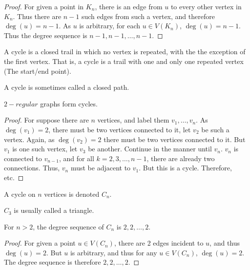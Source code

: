         \begin{proof}
        For given a point in $K_n$, there is an edge from $u$ to every other vertex in $K_n$. Thus there are $n-1$ such edges from such 
        a vertex, and therefore $\deg(u) = n-1$. As $u$ is arbitrary, for each $u\in V(K_n)$, $\deg(u) = n-1$. Thus the degree sequence is $n-1,n-1,\hdots, n-1$.
        \end{proof}
        \begin{definition}
        A cycle is a closed trail in which no vertex is repeated, with the the exception of the first vertex. That is, a cycle is a trail with one and only one repeated vertex (The start/end point).
        \end{definition}
        \begin{remark}
        A cycle is sometimes called a closed path.
        \end{remark}
        \begin{corollary}
        $2-regular$ graphs form cycles.
        \end{corollary}
        \begin{proof}
        For suppose there are $n$ vertices, and label them $v_1,\hdots, v_n$. As $\deg(v_1)=2$, there must be two vertices connected to it, let $v_2$ be such a vertex. Again, as $\deg(v_2)=2$ there must be two vertices connected to it. But $v_1$ is one such vertex, let $v_3$ be another. Continue in the manner until $v_n$. $v_n$ is connected to $v_{n-1}$, and for all $k=2,3,\hdots, n-1$, there are already two connections. Thus, $v_n$ must be adjacent to $v_1$. But this is a cycle. Therefore, etc.
        \end{proof}
        \begin{definition}
        A cycle on $n$ vertices is denoted $C_n$.
        \end{definition}
        \begin{remark}
        $C_3$ is usually called a triangle.
        \end{remark}
        \begin{corollary}
        For $n>2$, the degree sequence of $C_n$ is $2,2,\hdots, 2$.
        \end{corollary}
        \begin{proof}
        For given a point $u\in V(C_n)$, there are 2 edges incident to $u$, and thus $\deg(u) = 2$. But $u$ is arbitrary, and thus for any $u\in V(C_n)$, $\deg(u) = 2$. The degree sequence is therefore $2,2,\hdots, 2$.
        \end{proof}
